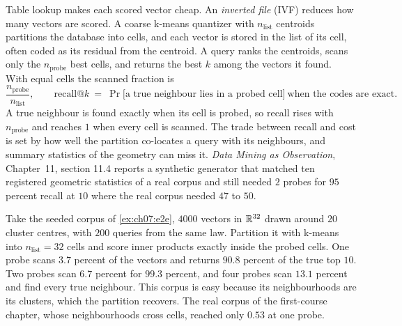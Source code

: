 Table lookup makes each scored vector cheap. An \emph{inverted file} (IVF) reduces how many vectors are scored. A coarse k-means quantizer with $n_{\mathrm{list}}$ centroids partitions the database into cells, and each vector is stored in the list of its cell, often coded as its residual from the centroid. A query ranks the centroids, scans only the $n_{\mathrm{probe}}$ best cells, and returns the best $k$ among the vectors it found. With equal cells the scanned fraction is
\begin{equation}\label{eq:ch07:ivf}
\frac{n_{\mathrm{probe}}}{n_{\mathrm{list}}},\qquad
\mathrm{recall}@k\ =\ \Pr\big[\text{a true neighbour lies in a probed cell}\big]\ \text{when the codes are exact.}
\end{equation}
A true neighbour is found exactly when its cell is probed, so recall rises with $n_{\mathrm{probe}}$ and reaches $1$ when every cell is scanned. The trade between recall and cost is set by how well the partition co-locates a query with its neighbours, and summary statistics of the geometry can miss it. \emph{Data Mining as Observation}, Chapter~11, section 11.4 reports a synthetic generator that matched ten registered geometric statistics of a real corpus and still needed $2$ probes for $95$ percent recall at $10$ where the real corpus needed $47$ to $50$.

\begin{example}\label{ex:ch07:ivf}
Take the seeded corpus of \cref{ex:ch07:e2e}, $4000$ vectors in $\mathbb{R}^{32}$ drawn around $20$ cluster centres, with $200$ queries from the same law. Partition it with k-means into $n_{\mathrm{list}}=32$ cells and score inner products exactly inside the probed cells. One probe scans $3.7$ percent of the vectors and returns $90.8$ percent of the true top $10$. Two probes scan $6.7$ percent for $99.3$ percent, and four probes scan $13.1$ percent and find every true neighbour. This corpus is easy because its neighbourhoods are its clusters, which the partition recovers. The real corpus of the first-course chapter, whose neighbourhoods cross cells, reached only $0.53$ at one probe.
\end{example}

